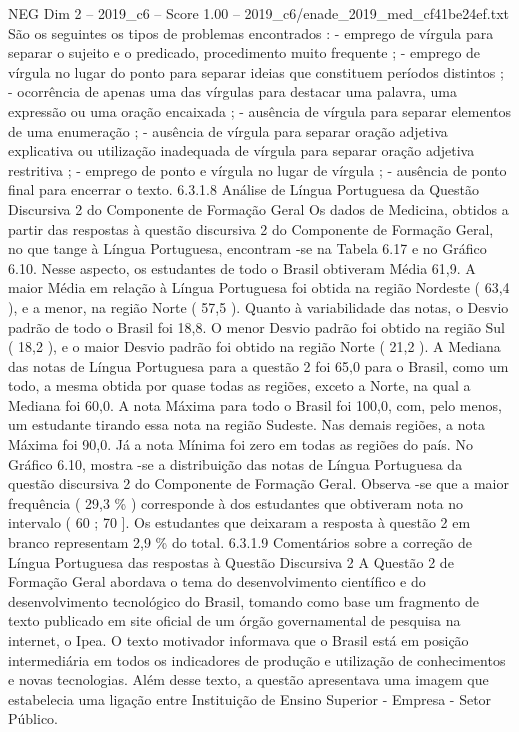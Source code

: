 \begin{textsample}{NEG Dim 2 – 2019\_c6 – Score 1.00 – 2019\_c6/enade\_2019\_med\_cf41be24ef.txt}
São os seguintes os tipos de problemas encontrados : - emprego de vírgula para separar o sujeito e o predicado, procedimento muito frequente ; - emprego de vírgula no lugar do ponto para separar ideias que constituem períodos distintos ; - ocorrência de apenas uma das vírgulas para destacar uma palavra, uma expressão ou uma oração encaixada ; - ausência de vírgula para separar elementos de uma enumeração ; - ausência de vírgula para separar oração adjetiva explicativa ou utilização inadequada de vírgula para separar oração adjetiva restritiva ; - emprego de ponto e vírgula no lugar de vírgula ; - ausência de ponto final para encerrar o texto. 6.3.1.8 Análise de Língua Portuguesa da Questão Discursiva 2 do Componente de Formação Geral Os dados de Medicina, obtidos a partir das respostas à questão discursiva 2 do Componente de Formação Geral, no que tange à Língua Portuguesa, encontram -se na Tabela 6.17 e no Gráfico 6.10.
Nesse aspecto, os estudantes de todo o Brasil obtiveram Média 61,9.
A maior Média em relação à Língua Portuguesa foi obtida na região Nordeste ( 63,4 ), e a menor, na região Norte ( 57,5 ).
Quanto à variabilidade das notas, o Desvio padrão de todo o Brasil foi 18,8.
O menor Desvio padrão foi obtido na região Sul ( 18,2 ), e o maior Desvio padrão foi obtido na região Norte ( 21,2 ).
A Mediana das notas de Língua Portuguesa para a questão 2 foi 65,0 para o Brasil, como um todo, a mesma obtida por quase todas as regiões, exceto a Norte, na qual a Mediana foi 60,0.
A nota Máxima para todo o Brasil foi 100,0, com, pelo menos, um estudante tirando essa nota na região Sudeste.
Nas demais regiões, a nota Máxima foi 90,0.
Já a nota Mínima foi zero em todas as regiões do país.
No Gráfico 6.10, mostra -se a distribuição das notas de Língua Portuguesa da questão discursiva 2 do Componente de Formação Geral.
Observa -se que a maior frequência ( 29,3 \% ) corresponde à dos estudantes que obtiveram nota no intervalo ( 60 ; 70 ].
Os estudantes que deixaram a resposta à questão 2 em branco representam 2,9 \% do total. 6.3.1.9 Comentários sobre a correção de Língua Portuguesa das respostas à Questão Discursiva 2 A Questão 2 de Formação Geral abordava o tema do desenvolvimento científico e do desenvolvimento tecnológico do Brasil, tomando como base um fragmento de texto publicado em site oficial de um órgão governamental de pesquisa na internet, o Ipea.
O texto motivador informava que o Brasil está em posição intermediária em todos os indicadores de produção e utilização de conhecimentos e novas tecnologias.
Além desse texto, a questão apresentava uma imagem que estabelecia uma ligação entre Instituição de Ensino Superior - Empresa - Setor Público.

\end{textsample}
